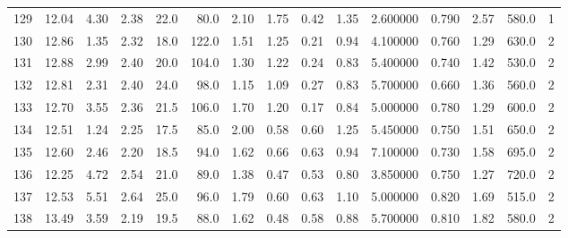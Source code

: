 \documentclass{article}
\begin{document}
\begin{tabular}{lrrrrrrrrrrrrrr}
    129 &    12.04 &        4.30 &  2.38 &               22.0 &       80.0 &           2.10 &        1.75 &                  0.42 &             1.35 &         2.600000 &  0.790 &                          2.57 &    580.0 &      1 \\
    130 &    12.86 &        1.35 &  2.32 &               18.0 &      122.0 &           1.51 &        1.25 &                  0.21 &             0.94 &         4.100000 &  0.760 &                          1.29 &    630.0 &      2 \\
    131 &    12.88 &        2.99 &  2.40 &               20.0 &      104.0 &           1.30 &        1.22 &                  0.24 &             0.83 &         5.400000 &  0.740 &                          1.42 &    530.0 &      2 \\
    132 &    12.81 &        2.31 &  2.40 &               24.0 &       98.0 &           1.15 &        1.09 &                  0.27 &             0.83 &         5.700000 &  0.660 &                          1.36 &    560.0 &      2 \\
    133 &    12.70 &        3.55 &  2.36 &               21.5 &      106.0 &           1.70 &        1.20 &                  0.17 &             0.84 &         5.000000 &  0.780 &                          1.29 &    600.0 &      2 \\
    134 &    12.51 &        1.24 &  2.25 &               17.5 &       85.0 &           2.00 &        0.58 &                  0.60 &             1.25 &         5.450000 &  0.750 &                          1.51 &    650.0 &      2 \\
    135 &    12.60 &        2.46 &  2.20 &               18.5 &       94.0 &           1.62 &        0.66 &                  0.63 &             0.94 &         7.100000 &  0.730 &                          1.58 &    695.0 &      2 \\
    136 &    12.25 &        4.72 &  2.54 &               21.0 &       89.0 &           1.38 &        0.47 &                  0.53 &             0.80 &         3.850000 &  0.750 &                          1.27 &    720.0 &      2 \\
    137 &    12.53 &        5.51 &  2.64 &               25.0 &       96.0 &           1.79 &        0.60 &                  0.63 &             1.10 &         5.000000 &  0.820 &                          1.69 &    515.0 &      2 \\
    138 &    13.49 &        3.59 &  2.19 &               19.5 &       88.0 &           1.62 &        0.48 &                  0.58 &             0.88 &         5.700000 &  0.810 &                          1.82 &    580.0 &      2 \\

\end{tabular}
\end{document}
